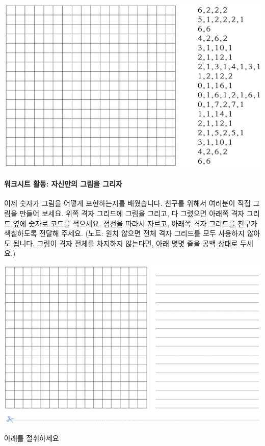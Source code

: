 \documentclass[]{article}
\begin{document}
\includegraphics{csunplugged/01-part/img/ch02-img/02-image-03-worksheet-03.png}

\mbox{}\paragraph{워크시트 활동: 자신만의 그림을 그리자}\label{section-36}

이제 숫자가 그림을 어떻게 표현하는지를 배웠습니다. 친구를 위해서
여러분이 직접 그림을 만들어 보세요. 위쪽 격자 그리드에 그림을 그리고, 다
그렸으면 아래쪽 격자 그리드 옆에 숫자로 코드를 적으세요. 점선을 따라서
자르고, 아래쪽 격자 그리드를 친구가 색칠하도록 전달해 주세요. (노트:
원치 않으면 전체 격자 그리드를 모두 사용하지 않아도 됩니다. 그림이 격자
전체를 차지하지 않는다면, 아래 몇몇 줄을 공백 상태로 두세요.)

\includegraphics{csunplugged/01-part/img/ch02-img/02-image-04-worksheet-01.png}

아래를 절취하세요
\end{document}
